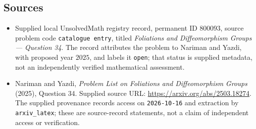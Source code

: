 \documentclass[11pt]{article}
\begin{document}
\subsection{Sources}
\begin{itemize}
\item Supplied local UnsolvedMath registry record, permanent ID \(800093\), source problem code \texttt{catalogue entry}, titled \emph{Foliations and Diffeomorphism Groups --- Question 34}. The record attributes the problem to Nariman and Yazdi, with proposed year \(2025\), and labels it \texttt{open}; that status is supplied metadata, not an independently verified mathematical assessment.
\item Nariman and Yazdi, \emph{Problem List on Foliations and Diffeomorphism Groups} (2025), Question 34. Supplied source URL: \url{https://arxiv.org/abs/2503.18274}. The supplied provenance records access on \texttt{2026-10-16} and extraction by \texttt{arxiv\_latex}; these are source-record statements, not a claim of independent access or verification.
\end{itemize}
\end{document}

